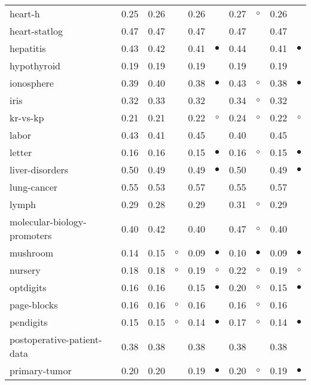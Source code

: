 {\begin{longtable}{lrr@{\hspace{0.1cm}}cr@{\hspace{0.1cm}}cr@{\hspace{0.1cm}}cr@{\hspace{0.1cm}}c}
heart-h & 0.25 & 0.26 &           & 0.26 &           & 0.27 &   $\circ$ & 0.26 &          \\
heart-statlog & 0.47 & 0.47 &           & 0.47 &           & 0.47 &           & 0.47 &          \\
hepatitis & 0.43 & 0.42 &           & 0.41 & $\bullet$ & 0.44 &           & 0.41 & $\bullet$\\
hypothyroid & 0.19 & 0.19 &           & 0.19 &           & 0.19 &           & 0.19 &          \\
ionosphere & 0.39 & 0.40 &           & 0.38 & $\bullet$ & 0.43 &   $\circ$ & 0.38 & $\bullet$\\
iris & 0.32 & 0.33 &           & 0.32 &           & 0.34 &   $\circ$ & 0.32 &          \\
kr-vs-kp & 0.21 & 0.21 &           & 0.22 &   $\circ$ & 0.24 &   $\circ$ & 0.22 &   $\circ$\\
labor & 0.43 & 0.41 &           & 0.45 &           & 0.40 &           & 0.45 &          \\
letter & 0.16 & 0.16 &           & 0.15 & $\bullet$ & 0.16 &   $\circ$ & 0.15 & $\bullet$\\
liver-disorders & 0.50 & 0.49 &           & 0.49 & $\bullet$ & 0.50 &           & 0.49 & $\bullet$\\
lung-cancer & 0.55 & 0.53 &           & 0.57 &           & 0.55 &           & 0.57 &          \\
lymph & 0.29 & 0.28 &           & 0.29 &           & 0.31 &   $\circ$ & 0.29 &          \\
molecular-biology-promoters & 0.40 & 0.42 &           & 0.40 &           & 0.47 &   $\circ$ & 0.40 &          \\
mushroom & 0.14 & 0.15 &   $\circ$ & 0.09 & $\bullet$ & 0.10 & $\bullet$ & 0.09 & $\bullet$\\
nursery & 0.18 & 0.18 &   $\circ$ & 0.19 &   $\circ$ & 0.22 &   $\circ$ & 0.19 &   $\circ$\\
optdigits & 0.16 & 0.16 &           & 0.15 & $\bullet$ & 0.20 &   $\circ$ & 0.15 & $\bullet$\\
page-blocks & 0.16 & 0.16 &   $\circ$ & 0.16 &           & 0.16 &   $\circ$ & 0.16 &          \\
pendigits & 0.15 & 0.15 &   $\circ$ & 0.14 & $\bullet$ & 0.17 &   $\circ$ & 0.14 & $\bullet$\\
postoperative-patient-data & 0.38 & 0.38 &           & 0.38 &           & 0.38 &           & 0.38 &          \\
primary-tumor & 0.20 & 0.20 &           & 0.19 & $\bullet$ & 0.20 &   $\circ$ & 0.19 & $\bullet$\\

\end{longtable}}

